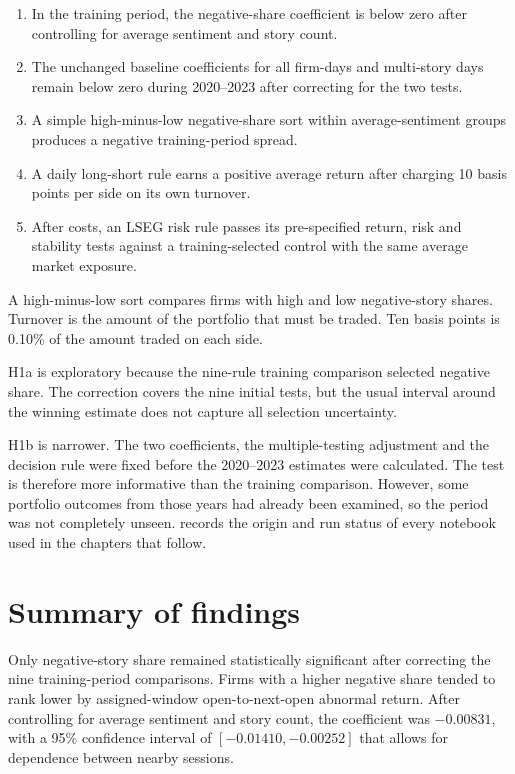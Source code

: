 \begin{enumerate}[leftmargin=1.1cm]
  \item[H1a.] In the training period, the negative-share coefficient is below zero after controlling for average sentiment and story count.
  \item[H1b.] The unchanged baseline coefficients for all firm-days and multi-story days remain below zero during 2020--2023 after correcting for the two tests.
  \item[H2.] A simple high-minus-low negative-share sort within average-sentiment groups produces a negative training-period spread.
  \item[H3.] A daily long-short rule earns a positive average return after charging 10 basis points per side on its own turnover.
  \item[H4.] After costs, an LSEG risk rule passes its pre-specified return, risk and stability tests against a training-selected control with the same average market exposure.
\end{enumerate}

A high-minus-low sort compares firms with high and low negative-story shares.
Turnover is the amount of the portfolio that must be traded. Ten basis points is
0.10\% of the amount traded on each side.

H1a is exploratory because the nine-rule training comparison selected negative
share. The correction covers the nine initial tests, but the usual interval
around the winning estimate does not capture all selection uncertainty.

H1b is narrower. The two coefficients, the multiple-testing adjustment and the
decision rule were fixed before the 2020--2023 estimates were calculated. The
test is therefore more informative than the training comparison. However,
some portfolio outcomes from those years had already been examined, so the
period was not completely unseen.
\ifdefined\withoutappendices
\else
   records the origin and run status of every notebook
  used in the chapters that follow.
\fi

\section{Summary of findings}

Only negative-story share remained statistically significant after correcting
the nine training-period comparisons. Firms with a higher negative share tended
to rank lower by assigned-window open-to-next-open abnormal return. After
controlling for average sentiment and story count, the coefficient was
$-0.00831$, with a 95\% confidence interval of $[-0.01410,-0.00252]$ that allows
for dependence between nearby sessions.

